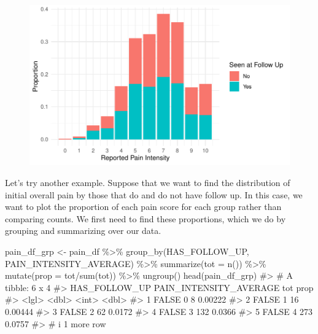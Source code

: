 \documentclass[
  letterpaper,
]{krantz}
\makeatletter
\newenvironment{Shaded}{\begin{snugshade}}{\end{snugshade}}
\newcommand{\AttributeTok}[1]{\textcolor[rgb]{0.40,0.45,0.13}{#1}}
\newcommand{\CommentTok}[1]{\textcolor[rgb]{0.37,0.37,0.37}{#1}}
\newcommand{\FunctionTok}[1]{\textcolor[rgb]{0.28,0.35,0.67}{#1}}
\newcommand{\NormalTok}[1]{\textcolor[rgb]{0.00,0.23,0.31}{#1}}
\newcommand{\OtherTok}[1]{\textcolor[rgb]{0.00,0.23,0.31}{#1}}
\newcommand{\SpecialCharTok}[1]{\textcolor[rgb]{0.37,0.37,0.37}{#1}}
\newenvironment{kframe}{%
\medskip{}
\setlength{\fboxsep}{.8em}
 \def\at@end@of@kframe{}%
 \ifinner\ifhmode%
  \def\at@end@of@kframe{\end{minipage}}%
  \begin{minipage}{\columnwidth}%
 \fi\fi%
 \def\FrameCommand##1{\hskip\@totalleftmargin \hskip-\fboxsep
 \colorbox{shadecolor}{##1}\hskip-\fboxsep
     \hskip-\linewidth \hskip-\@totalleftmargin \hskip\columnwidth}%
 \MakeFramed {\advance\hsize-\width
   \@totalleftmargin\z@ \linewidth\hsize
   \@setminipage}}%
 {\par\unskip\endMakeFramed%
 \at@end@of@kframe}
\renewenvironment{Shaded}{\begin{kframe}}{\end{kframe}}
\makeatother
\begin{document}
\begin{figure}[H]

{\centering \includegraphics[width=1\textwidth,height=\textheight]{book/7_visualization_ggplot_files/figure-pdf/unnamed-chunk-16-1.pdf}

}

\end{figure}

Let's try another example. Suppose that we want to find the distribution
of initial overall pain by those that do and do not have follow up. In
this case, we want to plot the proportion of each pain score for each
group rather than comparing counts. We first need to find these
proportions, which we do by grouping and summarizing over our data.

\begin{Shaded}
\begin{Highlighting}[]
\NormalTok{pain\_df\_grp }\OtherTok{\textless{}{-}}\NormalTok{ pain\_df }\SpecialCharTok{\%\textgreater{}\%}
  \FunctionTok{group\_by}\NormalTok{(HAS\_FOLLOW\_UP, PAIN\_INTENSITY\_AVERAGE) }\SpecialCharTok{\%\textgreater{}\%}
  \FunctionTok{summarize}\NormalTok{(}\AttributeTok{tot =} \FunctionTok{n}\NormalTok{()) }\SpecialCharTok{\%\textgreater{}\%}
  \FunctionTok{mutate}\NormalTok{(}\AttributeTok{prop =}\NormalTok{ tot}\SpecialCharTok{/}\FunctionTok{sum}\NormalTok{(tot)) }\SpecialCharTok{\%\textgreater{}\%}
  \FunctionTok{ungroup}\NormalTok{()}
\FunctionTok{head}\NormalTok{(pain\_df\_grp)}
\CommentTok{\#\textgreater{} \# A tibble: 6 x 4}
\CommentTok{\#\textgreater{}   HAS\_FOLLOW\_UP PAIN\_INTENSITY\_AVERAGE   tot    prop}
\CommentTok{\#\textgreater{}   \textless{}lgl\textgreater{}                          \textless{}dbl\textgreater{} \textless{}int\textgreater{}   \textless{}dbl\textgreater{}}
\CommentTok{\#\textgreater{} 1 FALSE                              0     8 0.00222}
\CommentTok{\#\textgreater{} 2 FALSE                              1    16 0.00444}
\CommentTok{\#\textgreater{} 3 FALSE                              2    62 0.0172 }
\CommentTok{\#\textgreater{} 4 FALSE                              3   132 0.0366 }
\CommentTok{\#\textgreater{} 5 FALSE                              4   273 0.0757 }
\CommentTok{\#\textgreater{} \# i 1 more row}
\end{Highlighting}
\end{Shaded}
\end{document}
